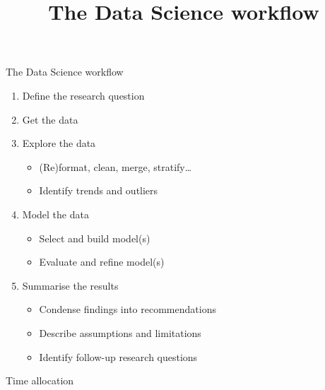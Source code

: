 

\title{The Data Science workflow}



\maketitle

\begin{frame}{The Data Science workflow}
    \begin{enumerate}
        \item Define the \alert{research question}
        \item \alert{Get} the data
        \item \alert{Explore} the data
              \begin{itemize}
                  \item (Re)format, clean, merge, stratify\ldots
                  \item Identify trends and outliers
              \end{itemize}
        \item \alert{Model} the data
              \begin{itemize}
                  \item Select and build model(s)
                  \item Evaluate and refine model(s)
              \end{itemize}
        \item \alert{Summarise} the results
              \begin{itemize}
                  \item Condense findings into recommendations
                  \item Describe assumptions and limitations
                  \item Identify follow\hyp{}up research questions
              \end{itemize}
    \end{enumerate}
\end{frame}

\begin{frame}{Time allocation}
\end{frame}

